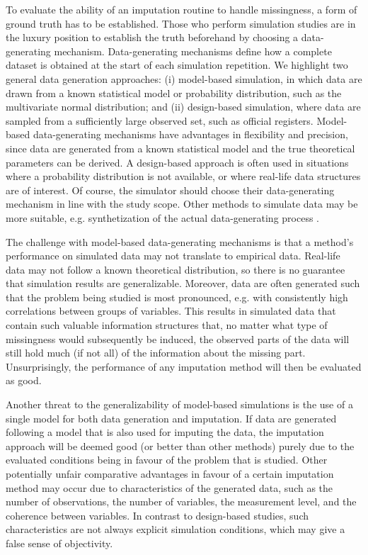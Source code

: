\documentclass[bimj,fleqn]{w-art}
\begin{document}
To evaluate the ability of an imputation routine to handle missingness, a form of ground  truth has to be established. Those who perform simulation studies are in the luxury position to establish the truth beforehand by choosing a data-generating mechanism. Data-generating mechanisms define how a complete dataset is obtained at the start of each simulation repetition. We highlight two general data generation approaches: (i) model-based simulation, in which data are drawn from a known statistical model or probability distribution, such as the multivariate normal distribution; and (ii) design-based simulation, where data are sampled from a sufficiently large observed set, such as official registers. Model-based data-generating mechanisms have advantages in flexibility and precision, since data are generated from a known statistical model and the true theoretical parameters can be derived. A design-based approach is often used in situations where a probability distribution is not available, or where real-life data structures are of interest. Of course, the simulator should choose their data-generating mechanism in line with the study scope. Other methods to simulate data may be more suitable, e.g. synthetization of the actual data-generating process \citep{li22,volk21}. %

The challenge with model-based data-generating mechanisms is that a method's performance on simulated data may not translate to empirical data. Real-life data may not follow a known theoretical distribution, so there is no guarantee that simulation results are generalizable. Moreover, data are often generated such that the problem being studied is most pronounced, e.g. with consistently high correlations between groups of variables. This results in simulated data that contain such valuable information structures that, no matter what type of missingness would subsequently be induced, the observed parts of the data will still hold much (if not all) of the information about the missing part. Unsurprisingly, the performance of any imputation method will then be evaluated as good.

Another threat to the generalizability of model-based simulations is the use of a single model for both data generation and imputation. If data are generated following a model that is also used for imputing the data, the imputation approach will be deemed good (or better than other methods) purely due to the evaluated conditions being in favour of the problem that is studied. Other potentially unfair comparative advantages in favour of a certain imputation method may occur due to characteristics of the generated data, such as the number of observations, the number of variables, the measurement level, and the coherence between variables. In contrast to design-based studies, such characteristics are not always explicit simulation conditions, which may give a false sense of objectivity.
\end{document}
